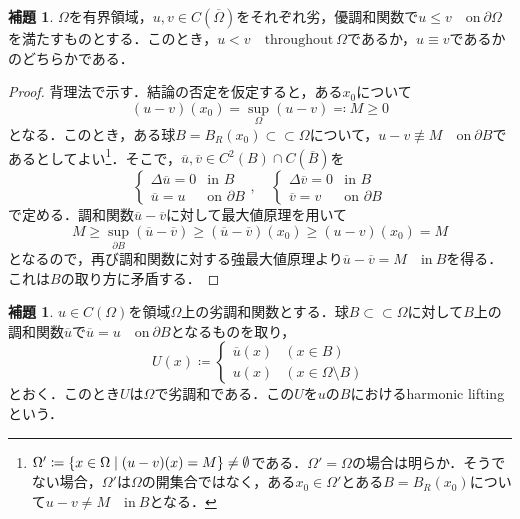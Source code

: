 \documentclass[a4paper]{ltjsarticle}
\newcommand{\Om}{\Omega}
\newcommand{\pOm}{\partial\Omega}
\newcommand{\Ombar}{\overline{\Omega}}
\newcommand{\ssubset}{\subset\subset}
\newcommand{\inn}{\quad\text{in}\ }
\newcommand{\on}{\quad \text{on}\ }
\newcommand{\1}{\mathbbm{1}}
\numberwithin{equation}{section}
\theoremstyle{definition}
\newtheorem{lem}[thm]{補題}
\begin{document}
\begin{lem}\label{lem:perron_2}
    $\Om$を有界領域，$u,v\in C(\Ombar)$をそれぞれ劣，優調和関数で$u\leq v\on\pOm$を満たすものとする．このとき，$u<v\quad\text{throughout}\ \Om$であるか，$u\equiv v$であるかのどちらかである．
\end{lem}
\begin{proof}
    背理法で示す．結論の否定を仮定すると，ある$x_0$について
    \begin{equation}
        (u-v)(x_0)=\sup_{\Om}(u-v)\eqqcolon M\geq0 
    \end{equation}
    となる．このとき，ある球$B=B_R(x_0)\ssubset \Om$について，$u-v\not\equiv M\on \partial B$であるとしてよい\footnote{$\Om'\coloneqq\qty{x\in \Om\mid (u-v)(x)=M}\neq\emptyset$である．$\Om'=\Om$の場合は明らか．そうでない場合，$\Om'$は$\Om$の開集合ではなく，ある$x_0\in \Om'$とある$B=B_R(x_0)$について$u-v\neq M\inn B$となる．}．そこで，$\overline{u},\overline{v}\in C^2(B)\cap C(\overline{B})$を
    \begin{equation}
        \begin{cases}
            \Delta\overline{u}=0 & \text{in $B$}\\
            \overline{u} = u & \text{on $\partial B $} 
        \end{cases},\quad \begin{cases}
            \Delta\overline{v}=0 & \text{in $B$}\\
            \overline{v} = v & \text{on $\partial B $} 
        \end{cases}
    \end{equation}
    で定める．調和関数$\overline{u}-\overline{v}$に対して最大値原理を用いて
    \begin{equation}
        M\geq \sup_{\partial B}(\overline{u}-\overline{v})\geq (\overline{u}-\overline{v})(x_0)\geq (u-v)(x_0)=M 
    \end{equation}
    となるので，再び調和関数に対する強最大値原理より$\overline{u}-\overline{v}=M\inn B$を得る．これは$B$の取り方に矛盾する．
\end{proof}
\begin{lem}\label{lem:perron_3}
    $u\in C(\Om)$を領域$\Om$上の劣調和関数とする．球$B\ssubset \Om$に対して$B$上の調和関数$\overline{u}$で$\overline{u}=u\on \partial B$となるものを取り，
    \begin{equation}
        U(x)\coloneqq \begin{cases}
            \overline{u}(x)& (x\in B)\\
            u(x) & (x\in\Om\setminus  B)
        \end{cases}
    \end{equation}
    とおく．このとき$U$は$\Om$で劣調和である．この$U$を$u$の$B$におけるharmonic liftingという．
\end{lem}
\end{document}
